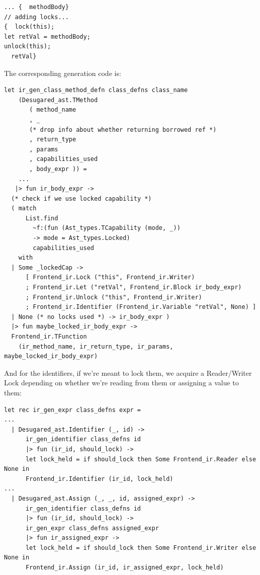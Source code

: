 
\begin{verbatim}
... {  methodBody}
// adding locks...
{  lock(this);  
let retVal = methodBody;  
unlock(this);
  retVal}
\end{verbatim}

The corresponding generation code is:

%

\begin{lstlisting}[language=caml,caption={ir\_gen\_class\_and\_function\_defns.ml}]
let ir_gen_class_method_defn class_defns class_name
    (Desugared_ast.TMethod
       ( method_name
       , _
       (* drop info about whether returning borrowed ref *)
       , return_type
       , params
       , capabilities_used
       , body_expr )) =
    ...
   |> fun ir_body_expr ->
  (* check if we use locked capability *)
  ( match
      List.find
        ~f:(fun (Ast_types.TCapability (mode, _))
        -> mode = Ast_types.Locked)
        capabilities_used
    with
  | Some _lockedCap ->
      [ Frontend_ir.Lock ("this", Frontend_ir.Writer)
      ; Frontend_ir.Let ("retVal", Frontend_ir.Block ir_body_expr)
      ; Frontend_ir.Unlock ("this", Frontend_ir.Writer)
      ; Frontend_ir.Identifier (Frontend_ir.Variable "retVal", None) ]
  | None (* no locks used *) -> ir_body_expr )
  |> fun maybe_locked_ir_body_expr ->
  Frontend_ir.TFunction
    (ir_method_name, ir_return_type, ir_params, maybe_locked_ir_body_expr)
\end{lstlisting}
And for the identifiers, if we're meant to lock them, we acquire a
Reader/Writer Lock depending on whether we're reading from them or
assigning a value to them:

\begin{lstlisting}[language=caml,caption={ir\_gen\_expr.ml}]
let rec ir_gen_expr class_defns expr =
...
  | Desugared_ast.Identifier (_, id) ->
      ir_gen_identifier class_defns id
      |> fun (ir_id, should_lock) ->
      let lock_held = if should_lock then Some Frontend_ir.Reader else None in
      Frontend_ir.Identifier (ir_id, lock_held)
...
  | Desugared_ast.Assign (_, _, id, assigned_expr) ->
      ir_gen_identifier class_defns id
      |> fun (ir_id, should_lock) ->
      ir_gen_expr class_defns assigned_expr
      |> fun ir_assigned_expr ->
      let lock_held = if should_lock then Some Frontend_ir.Writer else None in
      Frontend_ir.Assign (ir_id, ir_assigned_expr, lock_held)
\end{lstlisting}

